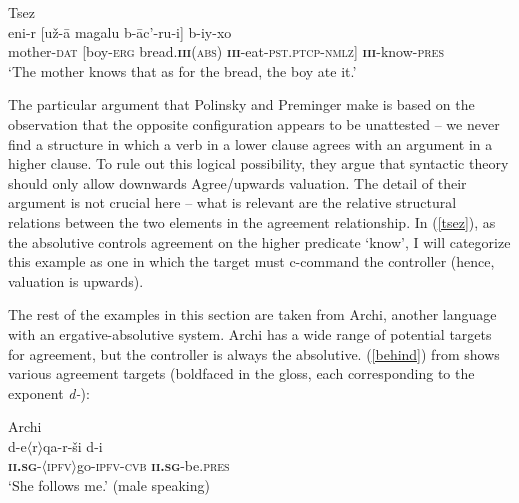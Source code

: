 \documentclass[output=paper,hidelinks]{langscibook}
\begin{document}
\ea\label{tsez}
Tsez\\%
\gll
eni-r [u\v{z}-\={a} magalu b-\={a}c’-ru-{{\textbeltl}}i] b-iy-xo\\
mother-\textsc{dat} [boy-\textsc{erg}
bread.{\bf\textsc{iii}}\textsc{(abs)}
{\bf\textsc{iii}}-eat-\textsc{pst.ptcp-nmlz}] 
{\bf\textsc{iii}}-know-\textsc{pres}\\%
\glt`The mother knows that as for the bread, the boy ate it.'
\z

The particular argument that Polinsky and Preminger make is based on
the observation that the opposite configuration appears to be
unattested -- we never find a structure in which a verb in a lower
clause agrees with an argument in a higher clause. To rule out this
logical possibility, they argue that syntactic theory should only
allow downwards Agree/upwards valuation. The detail of their argument
is not crucial here -- what is relevant are the relative structural
relations between the two elements in the agreement relationship. In
(\ref{tsez}), as the absolutive controls agreement on the higher
predicate `know', I will categorize this example as one in which the
target must c-command the controller (hence, valuation is upwards).

The rest of the examples in this section are taken from Archi, another
language with an ergative-absolutive system. Archi has a wide range of
potential targets for agreement, but the controller is always the
absolutive. (\ref{behind}) from \citet[67]{boch16} shows various agreement
targets (boldfaced in the gloss, each corresponding to the exponent
\textit{d-}):

\vbox{
\ea\label{behind}Archi\\%
\gll
[d-ez {\textchi}ir] d-e{$\scriptstyle\langle$}r{$\scriptstyle\rangle$}q\textsuperscript{\textrevglotstop}a-r-\v{s}i d-i\\
[{\bf\textsc{ii.sg}}-\textsc{1sg.dat} behind]
{\bf\textsc{ii.sg}}-\textsc{{$\scriptstyle\langle$}ipfv{$\scriptstyle\rangle$}}go-\textsc{ipfv-cvb} 
{\bf\textsc{ii.sg}}-be.\textsc{pres}\\%
\glt`She follows me.' (male speaking)
\z
}
\end{document}
